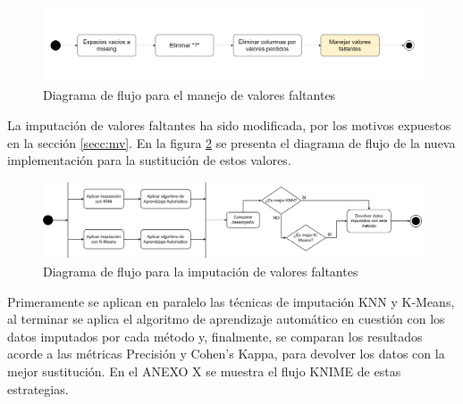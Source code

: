 \begin{figure}[H]
	\centering
	\includegraphics[width=1\linewidth]{"figuras/capi 2/preprocesado/valores faltantes.drawio"}
	\caption{Diagrama de flujo para el manejo de valores faltantes}
	\label{fig:valores-faltantes}
\end{figure}

La imputación de valores faltantes ha sido modificada, por los motivos expuestos en la sección \ref{secc:mv}. En la figura \ref{fig:mv-imputation} se presenta el diagrama de flujo de la nueva implementación para la sustitución de estos valores. 

\begin{figure}[H]
	\centering
	\includegraphics[width=1\linewidth]{"figuras/capi 2/preprocesado/mv imputation.drawio"}
	\caption{Diagrama de flujo para la imputación de valores faltantes}
	\label{fig:mv-imputation}
\end{figure}

Primeramente se aplican en paralelo las técnicas de imputación KNN y K-Means, al terminar se aplica el algoritmo de aprendizaje automático en cuestión con los datos imputados por cada método y, finalmente, se comparan los resultados acorde a las métricas Precisión y Cohen's Kappa, para devolver los datos con la mejor sustitución. En el ANEXO X se muestra el flujo KNIME de estas estrategias. 

